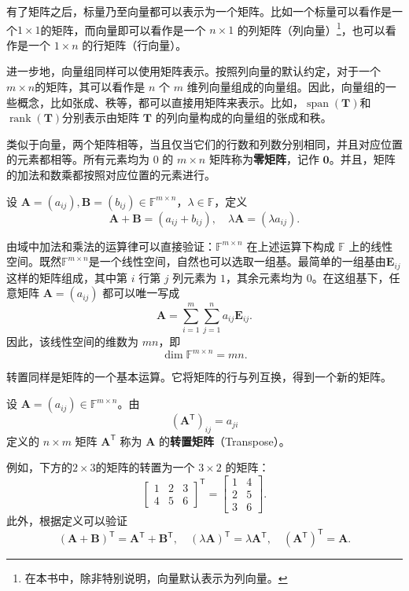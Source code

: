有了矩阵之后，标量乃至向量都可以表示为一个矩阵。比如一个标量可以看作是一个\( 1 \times 1 \)的矩阵，而向量即可以看作是一个 \(n \times 1\) 的列矩阵（列向量）\footnote{在本书中，除非特别说明，向量默认表示为列向量。}，也可以看作是一个 \(1 \times n\) 的行矩阵（行向量）。

进一步地，向量组同样可以使用矩阵表示。按照列向量的默认约定，对于一个\( m \times n \)的矩阵，其可以看作是 \(n\) 个 \(m\) 维列向量组成的向量组。因此，向量组的一些概念，比如张成、秩等，都可以直接用矩阵来表示。比如，\( \operatorname{span}(\mathbf{T}) \)和\( \operatorname{rank}(\mathbf{T}) \)分别表示由矩阵 \(\mathbf{T}\) 的列向量构成的向量组的张成和秩。

类似于向量，两个矩阵相等，当且仅当它们的行数和列数分别相同，并且对应位置的元素都相等。所有元素均为 \(0\) 的 \(m\times n\) 矩阵称为\textbf{零矩阵}，记作 \(\mathbf{0}\)。并且，矩阵的加法和数乘都按照对应位置的元素进行。

\begin{definition}[矩阵加法与数乘]
    \label{def_matrix_add_scalar}
    设 \(\mathbf{A}=(a_{ij}),\mathbf{B}=(b_{ij})\in \mathbb{F}^{m \times n}\)，\(\lambda\in\mathbb F\)，定义
    \[
        \mathbf{A}+\mathbf{B}=(a_{ij}+b_{ij}),
        \quad
        \lambda \mathbf{A}=(\lambda a_{ij}).
    \]
\end{definition}

由域中加法和乘法的运算律可以直接验证：\(\mathbb{F}^{m \times n}\) 在上述运算下构成 \(\mathbb F\) 上的线性空间。既然\( \mathbb{F}^{m \times n} \)是一个线性空间，自然也可以选取一组基。最简单的一组基由\( \mathbf{E}_{ij} \)这样的矩阵组成，其中第 \(i\) 行第 \(j\) 列元素为 \(1\)，其余元素均为 \(0\)。在这组基下，任意矩阵 \(\mathbf{A}=(a_{ij})\) 都可以唯一写成
\[
    \mathbf{A}=\sum_{i=1}^{m}\sum_{j=1}^{n}a_{ij}\mathbf{E}_{ij}.
\]
因此，该线性空间的维数为 \(mn\)，即
\[
    \dim \mathbb{F}^{m \times n}=mn.
\]

转置同样是矩阵的一个基本运算。它将矩阵的行与列互换，得到一个新的矩阵。

\begin{definition}[转置]
    \label{def_matrix_transpose}
    设 \(\mathbf{A}=(a_{ij})\in \mathbb{F}^{m \times n}\)。由
    \[
        (\mathbf{A}^{\mathsf T})_{ij}=a_{ji}
    \]
    定义的 \(n\times m\) 矩阵 \(\mathbf{A}^{\mathsf T}\) 称为 \(\mathbf{A}\) 的\textbf{转置矩阵}（Transpose）。
\end{definition}

例如，下方的\( 2 \times 3 \)的矩阵的转置为一个 \(3 \times 2\) 的矩阵：
\[
    \begin{bmatrix}
        1 & 2 & 3 \\
        4 & 5 & 6
    \end{bmatrix}^{\mathsf T}
    =
    \begin{bmatrix}
        1 & 4 \\
        2 & 5 \\
        3 & 6
    \end{bmatrix}.
\]
此外，根据定义可以验证
\[
    (\mathbf{A}+\mathbf{B})^{\mathsf T}=\mathbf{A}^{\mathsf T}+\mathbf{B}^{\mathsf T},
    \quad
    (\lambda \mathbf{A})^{\mathsf T}=\lambda \mathbf{A}^{\mathsf T},
    \quad
    (\mathbf{A}^{\mathsf T})^{\mathsf T}=\mathbf{A}.
\]

